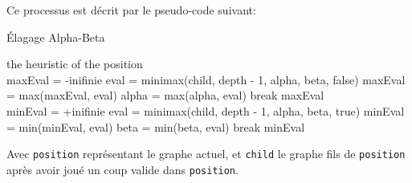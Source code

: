 \documentclass[a4paper,10pt]{article}
\begin{document}
Ce processus est décrit par le pseudo-code suivant:\\

\begin{algorithm}
\caption{Élagage Alpha-Beta}
\begin{algorithmic}
\STATE {}
\STATE
{}
\RETURN the heuristic of the position\\
\STATE
{}
\STATE maxEval = -inifinie
\STATE eval = minimax(child, depth - 1, alpha, beta, false)
\STATE maxEval = max(maxEval, eval)
\STATE alpha = max(alpha, eval)
\STATE break
\ENDIF
\ENDFOR
\RETURN maxEval\\
\STATE
\ELSE
\STATE minEval = +inifinie
\STATE eval = minimax(child, depth - 1, alpha, beta, true)
\STATE minEval = min(minEval, eval)
\STATE beta = min(beta, eval)
\STATE break
\ENDIF
\ENDFOR
\RETURN minEval
\ENDIF
\end{algorithmic}
\end{algorithm}

Avec \texttt{position} représentant le graphe actuel, et \texttt{child} le graphe fils de \texttt{position} après avoir joué un coup valide dans \texttt{position}.
\end{document}
